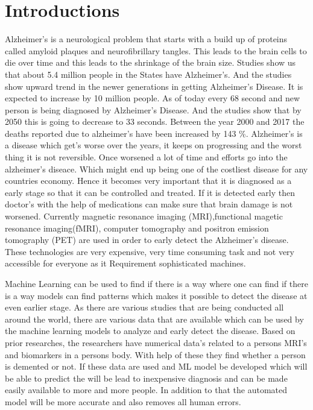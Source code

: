 \documentclass[12pt,onecolumn]{report}
\begin{document}
\chapter{Introductions}

Alzheimer's is a neurological problem that starts with a build up of proteins called amyloid plaques and neurofibrillary tangles. This leads to the brain cells to die over time and this leads to the shrinkage of the brain size\cite{mayo_alzheimers_2024}. Studies show us that about 5.4 million people in the States have Alzheimer's. And the studies show upward trend in the newer generations in getting Alzheimer's Disease. It is expected to increase by 10 million people. As of today every 68 second and new person is being diagnosed by Alzheimer's Disease. And the studies show that by 2050 this is going to decrease to 33 seconds\cite{2012131}. Between the year 2000 and 2017 the deaths reported due to alzheimer's have been increased by 143 \%\cite{2019321}. Alzheimer's is a disease which get's worse over the years, it keeps on progressing and the worst thing it is not reversible. Once worsened a lot of time and efforts go into the alzheimer's diseace. Which might end up being one of the costliest disease for any countries economy\cite{10.3389/fnagi.2024.1363458}. Hence it becomes very important that it is diagnosed as a early stage so that it can be controlled and treated. If it is detected early then doctor's with the help of medications can make sure that brain damage is not worsened. Currently magnetic resonance imaging (MRI),functional magetic resonance imaging(fMRI), computer tomography and positron emission tomography (PET) are used in order to early detect the Alzheimer's disease. These technologies are very expensive, very time consuming task and not very accessible for everyone as it Requirement sophisticated machines.

Machine Learning can be used to find if there is a way where one can find if there is a way models can find patterns which makes it possible to detect the disease at even earlier stage. As there are various studies that are being conducted all around the world, there are various data that are available which can be used by the machine learning models to analyze and early detect the disease. Based on prior researches, the researchers have numerical data's related to a persons MRI's and biomarkers in a persons body. With help of these they find whether a person is demented or not. If these data are used and ML model be developed which will be able to predict the will be lead to inexpensive diagnosis and can be made easily available to more and more people. In addition to that the automated model will be more accurate and also removes all human errors. 
\end{document}
